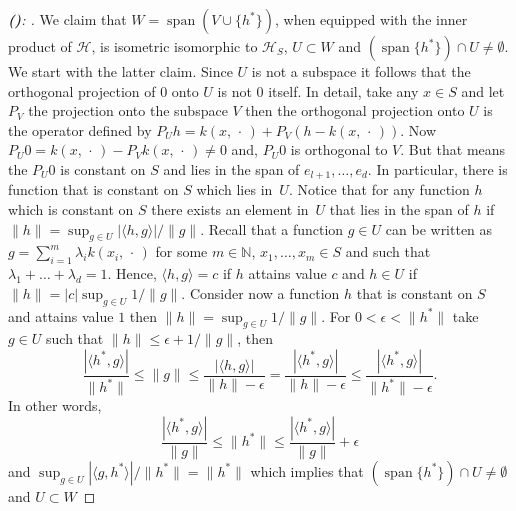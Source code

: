 \documentclass[AHL,Unicode,longabstracts,published]{cedram}
\theoremstyle{remark}
\DeclareMathOperator{\spn}{span}
\newcommand{\bbN}{\mathbb{N}}
\newcommand{\cH}{\mathcal{H}}
\newcounter{setofstep}
\newcounter{step}[setofstep]
\newenvironment{step}[1][]{\refstepcounter{step}\begin{proof}[{\textbf{(\thestep)}\if#1\empty\else: #1\fi}]}{\let\qed\relax\end{proof}}
\renewcommand{\thestep}{\alph{step}}
\begin{document}
\begin{proofc}
\begin{step}\label{prfprop2.15stp6}
We claim that $W = \spn(V \cup \{h^*\})$, when equipped with the inner product of $\cH$, is isometric isomorphic to $\cH_S$, $U \subset W$ and $(\spn \{h^*\}) \cap U \not = \emptyset$. We start with the latter claim. Since $U$ is not a subspace it follows that the orthogonal projection of $0$ onto $U$ is not $0$ itself. In detail, take any $x\in S$ and let $P_V$ the projection onto the subspace $V$ then the orthogonal projection onto $U$ is the operator defined by $P_U h = k(x,\,\cdot\,) + P_V(h - k(x,\,\cdot\,))$. Now $P_U 0 = k(x,\,\cdot\,) - P_V k(x,\,\cdot\,) \not = 0$ and, $P_U 0$ is orthogonal to $V$. But that means the $P_U 0$ is constant on $S$ and lies in the span of $e_{l+1},\dots, e_d$. In particular, there is function that is constant on $S$ which lies in~$U$. Notice that for any function $h$ which is constant on $S$ there exists an element in~$U$ that lies in the span of $h$ if $\|h\| = \sup_{g\in U} |\langle h, g \rangle|/\|g\|$. Recall that a function $g \in U$ can be written as $g = \sum_{i=1}^m \lambda_i k(x_i,\,\cdot\,)$ for some $m\in \bbN$, $x_1,\dots, x_m \in S$ and such that $\lambda_1 + \dots + \lambda_d = 1$. Hence, $\langle h, g \rangle = c$ if $h$ attains value $c$ and $h \in U$ if $\|h\| = |c| \sup_{g \in U} 1/\|g\|$. Consider now a function $h$ that is constant on $S$ and attains value $1$ then $\|h\| = \sup_{g \in U} 1/\|g\|$. For $0 < \epsilon < \|h^*\| $ take $g \in U$ such that $\|h\| \leq \epsilon + 1/\|g\|$, then
\[
\frac{|\langle h^*, g \rangle|}{\|h^*\|} \leq \|g\| \leq \frac{|\langle h, g \rangle|}{\|h\| - \epsilon} = \frac{|\langle h^*, g \rangle|}{\|h\| - \epsilon} \leq \frac{|\langle h^*, g \rangle|}{\|h^*\| - \epsilon}.
\]
In other words,
\[
\frac{|\langle h^*, g \rangle|}{\|g\|} \leq \|h^*\| \leq \frac{|\langle h^*, g \rangle|}{\|g\|} + \epsilon
\]
and $\sup_{g \in U} |\langle g, h^* \rangle|/\|h^*\| = \|h^*\|$ which implies that $(\spn \{h^*\}) \cap U \not = \emptyset$ and $U\subset W$




\end{step}
\end{proofc}
\end{document}
